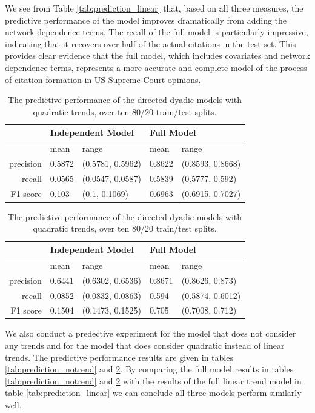 \documentclass[headsepline=true, abstracton]{scrartcl}
\begin{document}
We see from Table \ref{tab:prediction_linear} that, based on all three measures, the predictive performance of the model improves dramatically from adding the network dependence terms. The recall of the full model is particularly impressive, indicating that it recovers over half of the actual citations in the test set. This provides clear evidence that the full model, which includes covariates and network dependence terms, represents a more accurate and complete model of the process of citation formation in US Supreme Court opinions.

\begin{table}[H]
\centering
\begin{tabular}{rllll}
\hline \hline
& \multicolumn{2}{l}{Independent Model } & \multicolumn{2}{l}{Full Model} \\ \hline 
 & mean & range & mean & range \\ 
  \hline
precision & 0.5872 & (0.5781, 0.5962) & 0.8622 & (0.8593, 0.8668) \\ 
  recall & 0.0565 & (0.0547, 0.0587) & 0.5839 & (0.5777, 0.592) \\ 
  F1 score & 0.103 & (0.1, 0.1069) & 0.6963 & (0.6915, 0.7027) \\ 
   \hline \hline
\end{tabular}
\caption{The predictive performance of the directed dyadic models with no trends, over ten 80/20 train/test splits.}
\label{tab:prediction_notrend}
\vspace{0.4cm}
\begin{tabular}{rllll}
\hline \hline
& \multicolumn{2}{l}{Independent Model } & \multicolumn{2}{l}{Full Model} \\ \hline 
 & mean & range & mean & range \\ 
  \hline
precision & 0.6441 & (0.6302, 0.6536) & 0.8671 & (0.8626, 0.873) \\ 
  recall & 0.0852 & (0.0832, 0.0863) & 0.594 & (0.5874, 0.6012) \\ 
  F1 score & 0.1504 & (0.1473, 0.1525) & 0.705 & (0.7008, 0.712) \\ 
   \hline \hline
\end{tabular}
\caption{The predictive performance of the directed dyadic models with quadratic trends, over ten 80/20 train/test splits.}
\label{tab:prediction_quadratic}
\end{table}
We also conduct a predective experiment for the model that does not consider any trends and for the model that does consider quadratic instead of linear trends. The predictive performance results are given in tables \ref{tab:prediction_notrend} and \ref{tab:prediction_quadratic}. By comparing the full model results in tables \ref{tab:prediction_notrend} and \ref{tab:prediction_quadratic} with the results of the full linear trend model in table \ref{tab:prediction_linear} we can conclude all three models perform similarly well.   \\[0,5cm]
\end{document}
